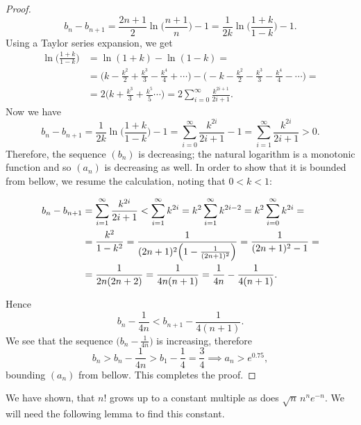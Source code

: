 \documentclass[11pt]{amsart}
\theoremstyle{plain}
\theoremstyle{definition}
\theoremstyle{remark}
\begin{document}
\begin{proof}
    \[
        b_n - b_{n+1} = \frac{2n+1}{2} \ln\biggl( \frac{n+1}{n} \biggr) - 1 = \frac{1}{2k}\ln\biggl( \frac{1+k}{1-k} \biggr) - 1.
    \]
    Using a Taylor series expansion, we get        
    \begin{equation*}
    \begin{split}
        \ln\biggl( \frac{1+k}{1-k} \biggr) &= \ln(1+k) - \ln(1-k) = \\
        &= \biggl(k - \frac{k^2}{2} + \frac{k^3}{3} - \frac{k^4}{4} + \cdots \biggr) - \biggl(-k - \frac{k^2}{2} - \frac{k^3}{3} - \frac{k^4}{4} - \cdots \biggr) = \\
        &= 2\biggl( k + \frac{k^3}{3} + \frac{k^5}{5} \cdots \biggr) = 
        2\sum_{i=0}^\infty \frac{k^{2i+1}}{2i+1}.
    \end{split}
    \end{equation*}
    Now we have 
    \[
        b_n - b_{n+1} = \frac{1}{2k}\ln\biggl(\frac{1+k}{1-k}\biggr) - 1 = \sum_{i=0}^\infty \frac{k^{2i}}{2i+1} - 1 = \sum_{i=1}^\infty \frac{k^{2i}}{2i+1} > 0.
    \]
    Therefore, the sequence $(b_n)$ is decreasing; the natural logarithm is a monotonic function and so $(a_n)$ is decreasing as well. In order to show that it is bounded from bellow, we resume the calculation, noting that $0 < k < 1$:
    \begin{allowdisplaybreaks}
    \begin{equation*}
    \begin{split}
        b_n - b_{n+1} &= \sum_{i=1}^\infty \frac{k^{2i}}{2i+1} < \sum_{i=1}^\infty k^{2i} = k^2\sum_{i=1}^\infty k^{2i-2} = k^2\sum_{i=0}^\infty k^{2i} = \\
        &= \frac{k^2}{1-k^2} = \frac{1}{(2n+1)^2\Bigl( 1 - \frac{1}{(2n+1)^2} \Bigr)} = 
        \frac{1}{(2n+1)^2 - 1} = \\
        &= \frac{1}{2n(2n+2)} = \frac{1}{4n(n+1)} = \frac{1}{4n} - \frac{1}{4(n+1)}.
    \end{split}
    \end{equation*}
    \end{allowdisplaybreaks}
    Hence 
    \[
        b_n - \frac{1}{4n} < b_{n+1} - \frac{1}{4(n+1)}.
    \]
    We see that the sequence $\bigl(b_n - \frac{1}{4n}\bigr)$ is increasing, therefore 
    \[
        b_n > b_n - \frac{1}{4n} > b_1 - \frac{1}{4} = \frac{3}{4} \implies a_n > e^{0.75},
    \]
    bounding $(a_n)$ from bellow. This completes the proof.
\end{proof}

 We have shown, that $n!$ grows up to a constant multiple as does $\sqrt{n}\,n^ne^{-n}$. We will need the following lemma to find this constant.
\end{document}
